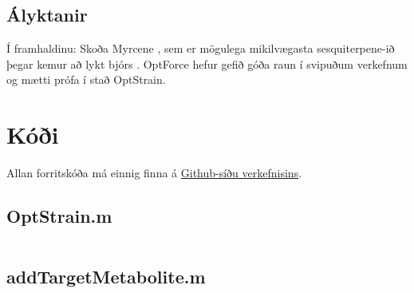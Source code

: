 \documentclass[11pt]{article}
\newcommand{\matlab}[1]{\inputminted[linenos, frame=lines, label=#1, fontsize=\small]{matlab}{#1}}
\begin{document}
\begin{multicols}{2}
\section{Ályktanir}


Í framhaldinu: Skoða Myrcene \cite[KEGG: C06074]{Kanehisa01012000}, sem er mögulega mikilvægasta sesquiterpene-ið þegar kemur að lykt bjórs \cite{guadagni1966odour}. OptForce\cite{ranganathan2010optforce} hefur gefið góða raun í svipuðum verkefnum og mætti prófa í stað OptStrain.




\end{multicols}


\clearpage
\appendix
\section{Kóði}
Allan forritskóða má einnig finna á \href{https://github.com/Ernir/optstrain}{Github-síðu verkefnisins}.
\subsection{OptStrain.m}
\label{code:OptStrain}
\matlab{../OptStrain.m}

\subsection{addTargetMetabolite.m}
\label{code:addTargetMetabolite}
\matlab{../addTargetMetabolite.m}
\end{document}
